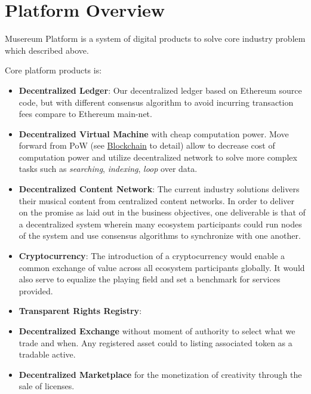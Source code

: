 \documentclass[12pt]{report}
\begin{document}
\chapter{Platform Overview}
\label{platform}
\begin{multicols}{2}
Musereum Platform is a system of digital products to solve core industry problem which described above.

Core platform products is:
\begin{itemize}
	\item \textbf{Decentralized Ledger}: Our decentralized ledger based on Ethereum source code, but with different consensus algorithm to avoid incurring transaction fees compare to Ethereum main-net.
	\item \textbf{Decentralized Virtual Machine} with cheap computation power. Move forward from PoW (see \hyperref[tech-blockchain]{Blockchain} to detail) allow to decrease cost of computation power and utilize decentralized network to solve more complex tasks such as \textit{searching}, \textit{indexing}, \textit{loop} over data.
	\item \textbf{Decentralized Content Network}: The current industry solutions  delivers their musical content from centralized content networks. In order to deliver on the promise as laid out in the business objectives, one deliverable is that of a decentralized system wherein many ecosystem participants could run nodes of the system and use consensus algorithms to synchronize
with one another.
	\item \textbf{Cryptocurrency}: The introduction of a cryptocurrency would enable a common exchange of value across all ecosystem participants globally. It would also serve to equalize the playing field and set a benchmark for services provided.
	\item \textbf{Transparent Rights Registry}: 
	\item \textbf{Decentralized Exchange} without moment of authority to select what we trade and when. Any registered asset could to listing associated token as a tradable active.
	\item \textbf{Decentralized Marketplace} for the monetization of creativity through the sale of licenses.
\end{itemize}
\end{multicols}
\end{document}
